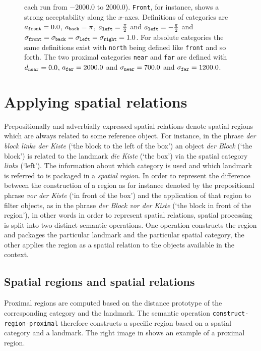 \begin{figure}
{ each run from $-2000.0$ to $2000.0$). 
 {\footnotesize\tt Front}, for instance, shows a strong acceptability along the $x$-axes. Definitions of 
categories are $a_{\footnotesize\tt front}=0.0$, $a_{\footnotesize\tt back}=\pi$, 
$a_{\footnotesize\tt left}=\frac{\pi}{2}$ and $a_{\footnotesize\tt left}=-\frac{\pi}{2}$ and
$\sigma_{\footnotesize\tt front}=\sigma_{\footnotesize\tt back}=\sigma_{\footnotesize\tt left}=\sigma_{\footnotesize\tt right} = 1.0$.
For absolute categories the same definitions exist with {\footnotesize\tt north} being defined like {\footnotesize\tt front}
and so forth.
The two proximal categories {\footnotesize\tt near} and {\footnotesize\tt far} are defined 
with $d_{\footnotesize\tt near}=0.0$, $a_{\footnotesize\tt far}=2000.0$ and 
$\sigma_{\footnotesize\tt near}=700.0$ and $\sigma_{\footnotesize\tt far}=1200.0$.}
\end{figure}


\section{Applying spatial relations}
Prepositionally and adverbially expressed spatial relations denote 
spatial regions which are always related to some reference object.
For instance, in the phrase \textit{der block links der Kiste} (`the block to the left
of the box') an object \textit{der Block} (`the block') is related to the landmark 
\textit{die Kiste} (`the box') via the spatial category \textit{links} (`left'). 
The information about which category is used and which landmark
is referred to is packaged in a \emph{spatial region}.
In order to represent the difference between the construction of a region
as for instance denoted by the prepositional phrase \textit{vor der Kiste}
(`in front of the box') and the application of that region to filter objects,
as in the phrase \textit{der Block vor der Kiste} (`the block in front of the region'),
in other words in order to represent spatial relations, spatial 
processing is split into two distinct semantic operations. One operation
constructs the region and packages the particular landmark and the particular
spatial category, the other applies the region as a spatial relation 
to the objects available in the context.

\subsection{Spatial regions and spatial relations}
Proximal regions are computed based on the distance prototype of the 
corresponding category and the landmark. The semantic operation
{\footnotesize\tt construct-region-proximal} therefore constructs a specific 
region based on a spatial category and a landmark. 
The right image in  
shows an example of a proximal region. 

